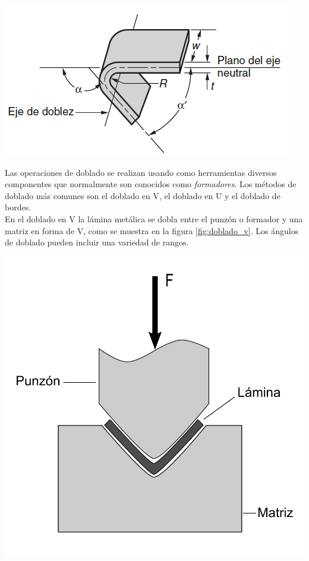 \begin{center}
\includegraphics[scale=0.6]{src/ch2/doblado_lamina.png}
\label{fig:doblado_lamina}
\end{center}

Las operaciones de doblado se realizan usando como herramientas diversos componentes 
que normalmente son conocidos como \textit{formadores}. Los métodos de doblado más 
comunes son el doblado en V, el doblado en U y el doblado de bordes.\\

En el doblado en V la lámina metálica se dobla entre el punzón o formador y una matriz 
en forma de V, como se muestra en la figura \ref{fig:doblado_v}. Los ángulos de doblado 
pueden incluir una variedad de rangos.

\begin{center}
\includegraphics[scale=0.35]{src/ch2/doblado_v}
\label{fig:doblado_v}
\end{center}

